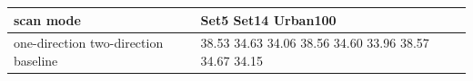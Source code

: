 \begin{tabular}{ll}
\toprule
scan mode & Set5 Set14 Urban100 \\
\midrule
one-direction two-direction baseline & 38.53 34.63 34.06 38.56 34.60 33.96 38.57 34.67 34.15 \\
\bottomrule
\end{tabular}
